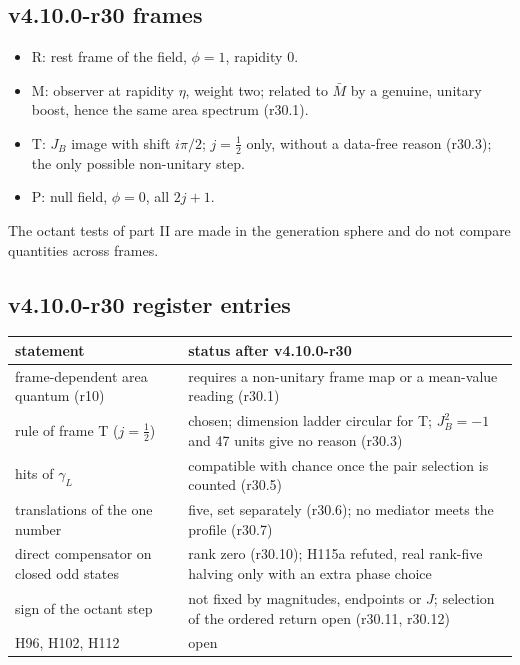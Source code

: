 \subsection*{v4.10.0-r30 frames}
\label{subsec:v4100-r30-frames}

\begin{itemize}[leftmargin=2em]
\item R: rest frame of the field, \(\phi=1\), rapidity \(0\).
\item M: observer at rapidity \(\eta\), weight two; related to \(\bar M\) by a genuine, unitary boost, hence the same area spectrum (r30.1).
\item T: \(J_B\) image with shift \(i\pi/2\); \(j=\tfrac12\) only, without a data-free reason (r30.3); the only possible non-unitary step.
\item P: null field, \(\phi=0\), all \(2j+1\).
\end{itemize}
The octant tests of part II are made in the generation sphere and do not compare quantities across frames.

\subsection*{v4.10.0-r30 register entries}
\label{subsec:v4100-r30-register}

\begin{center}
\small
\begin{tabular}{@{}>{\raggedright\arraybackslash}p{}>{\raggedright\arraybackslash}p{}@{}}
\toprule
statement & status after v4.10.0-r30\\
\midrule
frame-dependent area quantum (r10) & requires a non-unitary frame map or a mean-value reading (r30.1)\\
rule of frame T (\(j=\tfrac12\)) & chosen; dimension ladder circular for T; \(J_B^2=-1\) and 47 units give no reason (r30.3)\\
hits of \(\gamma_L\) & compatible with chance once the pair selection is counted (r30.5)\\
translations of the one number & five, set separately (r30.6); no mediator meets the profile (r30.7)\\
direct compensator on closed odd states & rank zero (r30.10); H115a refuted, real rank-five halving only with an extra phase choice\\
sign of the octant step & not fixed by magnitudes, endpoints or \(J\); selection of the ordered return open (r30.11, r30.12)\\
H96, H102, H112 & open\\
\bottomrule
\end{tabular}
\end{center}

